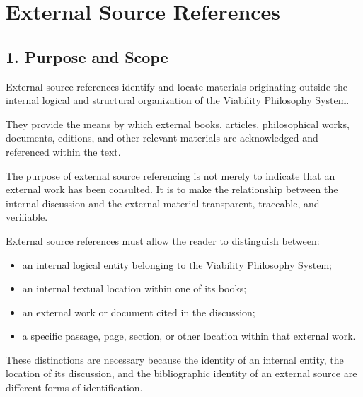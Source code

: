 
\cleardoublepage

\section*{External Source References}

{}


\subsection*{1. Purpose and Scope}

External source references identify and locate
materials originating outside the internal
logical and structural organization of the
Viability Philosophy System.

They provide the means by which external
books, articles, philosophical works,
documents, editions, and other relevant
materials are acknowledged and referenced
within the text.

The purpose of external source referencing
is not merely to indicate that an external
work has been consulted. It is to make
the relationship between the internal
discussion and the external material
transparent, traceable, and verifiable.

External source references must allow
the reader to distinguish between:

\begin{itemize}
    \item an internal logical entity belonging
    to the Viability Philosophy System;
    \item an internal textual location within
    one of its books;
    \item an external work or document cited
    in the discussion;
    \item a specific passage, page, section,
    or other location within that external work.
\end{itemize}

These distinctions are necessary because
the identity of an internal entity, the
location of its discussion, and the
bibliographic identity of an external
source are different forms of identification.

